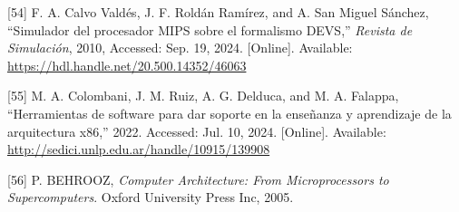 \documentclass[12pt,oneside]{templates/unerthesis}
\newcommand{\CSLLeftMargin}[1]{#1} %
\newcommand{\CSLRightInline}[1]{#1} %
\newlength{\cslhangindent}
\newenvironment{CSLReferences}[2] %
 {\setlength{\parindent}{0pt}%
  \setlength{\leftskip}{#1 pt\relax}%
  \setlength{\parskip}{#2 pt\relax}%
  \everypar{\setlength{\hangindent}{\cslhangindent}}}
 {\par}
\begin{document}
\begin{CSLReferences}{0}{0}
\leavevmode{}%
\CSLLeftMargin{{[}54{]} }%
\CSLRightInline{F. A. Calvo Valdés, J. F. Roldán Ramírez, and A. San Miguel Sánchez, {``Simulador del procesador {MIPS} sobre el formalismo {DEVS},''} \emph{Revista de Simulación}, 2010, Accessed: Sep. 19, 2024. {[}Online{]}. Available: \url{https://hdl.handle.net/20.500.14352/46063}}

\leavevmode{}%
\CSLLeftMargin{{[}55{]} }%
\CSLRightInline{M. A. Colombani, J. M. Ruiz, A. G. Delduca, and M. A. Falappa, {``Herramientas de software para dar soporte en la enseñanza y aprendizaje de la arquitectura x86,''} 2022. Accessed: Jul. 10, 2024. {[}Online{]}. Available: \url{http://sedici.unlp.edu.ar/handle/10915/139908}}

\leavevmode{}%
\CSLLeftMargin{{[}56{]} }%
\CSLRightInline{P. BEHROOZ, \emph{Computer {Architecture}: {From} {Microprocessors} to {Supercomputers}}. Oxford University Press Inc, 2005.}

\end{CSLReferences}

%


\end{document}
